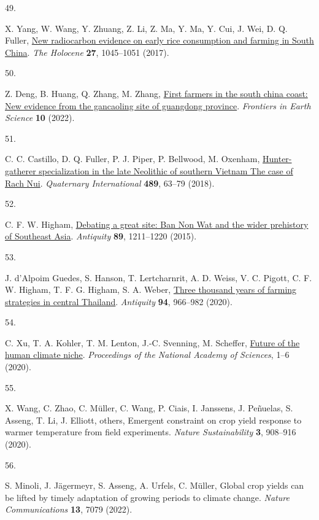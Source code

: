 \documentclass[
  letterpaper,
  DIV=11,
  numbers=noendperiod]{scrartcl}
\newlength{\cslhangindent}
\newlength{\csllabelwidth}
\newenvironment{CSLReferences}[2] %
 {\begin{list}{}{%
  \setlength{\itemindent}{0pt}
  \setlength{\leftmargin}{0pt}
  \setlength{\parsep}{0pt}
  \ifodd #1
   \setlength{\leftmargin}{\cslhangindent}
   \setlength{\itemindent}{-1\cslhangindent}
  \fi
  \setlength{\itemsep}{#2\baselineskip}}}
 {\end{list}}
\newcommand{\CSLLeftMargin}[1]{\parbox[t]{\csllabelwidth}{\strut#1\strut}}
\newcommand{\CSLRightInline}[1]{\parbox[t]{\linewidth - \csllabelwidth}{\strut#1\strut}}
\begin{document}
\begin{CSLReferences}{0}{1}
\CSLLeftMargin{49. }%
\CSLRightInline{X. Yang, W. Wang, Y. Zhuang, Z. Li, Z. Ma, Y. Ma, Y.
Cui, J. Wei, D. Q. Fuller,
\href{https://doi.org/10.1177/0959683616678465}{New radiocarbon evidence
on early rice consumption and farming in South China}. \emph{The
Holocene} \textbf{27}, 1045--1051 (2017).}

\CSLLeftMargin{50. }%
\CSLRightInline{Z. Deng, B. Huang, Q. Zhang, M. Zhang,
\href{https://doi.org/10.3389/feart.2022.858492}{First farmers in the
south china coast: New evidence from the gancaoling site of guangdong
province}. \emph{Frontiers in Earth Science} \textbf{10} (2022).}

\CSLLeftMargin{51. }%
\CSLRightInline{C. C. Castillo, D. Q. Fuller, P. J. Piper, P. Bellwood,
M. Oxenham,
\href{https://doi.org/10.1016/j.quaint.2016.11.034}{Hunter-gatherer
specialization in the late Neolithic of southern Vietnam {\textendash}
The case of Rach Nui}. \emph{Quaternary International} \textbf{489},
63--79 (2018).}

\CSLLeftMargin{52. }%
\CSLRightInline{C. F. W. Higham,
\href{https://doi.org/10.15184/aqy.2015.113}{Debating a great site: Ban
Non Wat and the wider prehistory of Southeast Asia}. \emph{Antiquity}
\textbf{89}, 1211--1220 (2015).}

\CSLLeftMargin{53. }%
\CSLRightInline{J. d'Alpoim Guedes, S. Hanson, T. Lertcharnrit, A. D.
Weiss, V. C. Pigott, C. F. W. Higham, T. F. G. Higham, S. A. Weber,
\href{https://doi.org/10.15184/aqy.2020.8}{Three thousand years of
farming strategies in central Thailand}. \emph{Antiquity} \textbf{94},
966--982 (2020).}

\CSLLeftMargin{54. }%
\CSLRightInline{C. Xu, T. A. Kohler, T. M. Lenton, J.-C. Svenning, M.
Scheffer, \href{https://doi.org/10.1073/pnas.1910114117}{Future of the
human climate niche}. \emph{Proceedings of the National Academy of
Sciences}, 1--6 (2020).}

\CSLLeftMargin{55. }%
\CSLRightInline{X. Wang, C. Zhao, C. Müller, C. Wang, P. Ciais, I.
Janssens, J. Peñuelas, S. Asseng, T. Li, J. Elliott, others, Emergent
constraint on crop yield response to warmer temperature from field
experiments. \emph{Nature Sustainability} \textbf{3}, 908--916 (2020).}

\CSLLeftMargin{56. }%
\CSLRightInline{S. Minoli, J. Jägermeyr, S. Asseng, A. Urfels, C.
Müller, Global crop yields can be lifted by timely adaptation of growing
periods to climate change. \emph{Nature Communications} \textbf{13},
7079 (2022).}


\end{CSLReferences}
\end{document}
